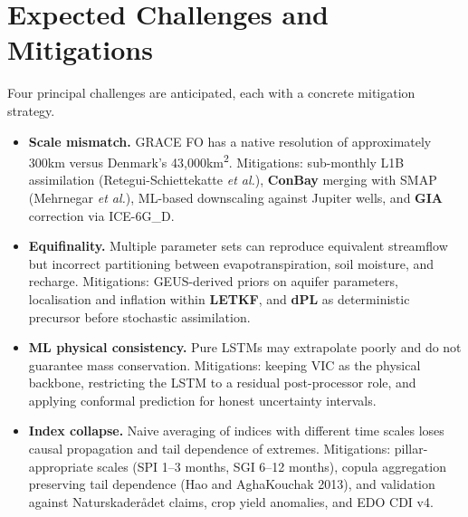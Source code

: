 \section{Expected Challenges and Mitigations}

Four principal challenges are anticipated, each with a concrete mitigation strategy.

\begin{itemize}

\item \textbf{Scale mismatch.} GRACE FO has a native resolution of approximately 300\nobreakspace km versus Denmark's 43,000\nobreakspace km\textsuperscript{2}. Mitigations: sub-monthly L1B assimilation (Retegui-Schiettekatte \textit{et al.}), \textbf{ConBay} merging with SMAP (Mehrnegar \textit{et al.}), ML-based downscaling against Jupiter wells, and \textbf{GIA} correction via ICE-6G\_D.

\item \textbf{Equifinality.} Multiple parameter sets can reproduce equivalent streamflow but incorrect partitioning between evapotranspiration, soil moisture, and recharge. Mitigations: GEUS-derived priors on aquifer parameters, localisation and inflation within \textbf{LETKF}, and \textbf{dPL} as deterministic precursor before stochastic assimilation.

\item \textbf{ML physical consistency.} Pure LSTMs may extrapolate poorly and do not guarantee mass conservation. Mitigations: keeping VIC as the physical backbone, restricting the LSTM to a residual post-processor role, and applying conformal prediction for honest uncertainty intervals.

\item \textbf{Index collapse.} Naive averaging of indices with different time scales loses causal propagation and tail dependence of extremes. Mitigations: pillar-appropriate scales (SPI 1--3 months, SGI 6--12 months), copula aggregation preserving tail dependence (Hao and AghaKouchak 2013), and validation against Naturskaderådet claims, crop yield anomalies, and EDO CDI v4.

\end{itemize}
